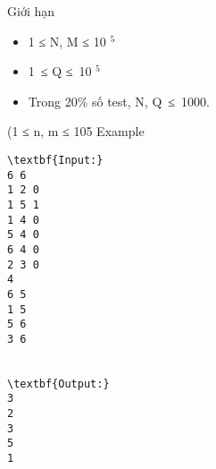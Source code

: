 Giới hạn
\begin{itemize}
	\item     1 ≤ N, M ≤ 10    $^     5    $
	\item     1 ≤ Q ≤ 10    $^     5    $
	\item     Trong 20\% số test, N, Q ≤ 1000.   
\end{itemize}     (1 ≤ n, m ≤ 105
Example
\begin{verbatim}
\textbf{Input:}
6 6
1 2 0
1 5 1
1 4 0
5 4 0
6 4 0
2 3 0
4
6 5
1 5
5 6
3 6


\textbf{Output:}
3
2
3
5
1

\end{verbatim}